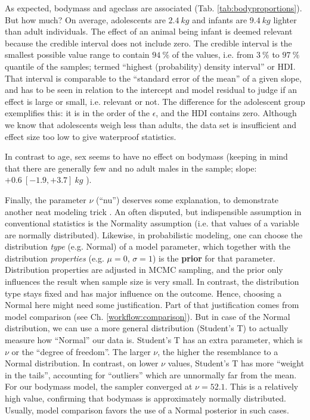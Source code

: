 As expected, bodymass and ageclass are associated (Tab. \ref{tab:bodyproportions}).
But how much?
On average, adolescents are \(2.4\ kg\) and infants are \(9.4\ kg\) lighter than adult individuals.
The effect of an animal being infant is deemed relevant because the credible interval does not include zero.
The credible interval is the smallest possible value range to contain \(94\ \%\) of the values, i.e. from \(3\ \%\) to \(97\ \%\) quantile of the samples; termed ``highest (probability) density interval'' or HDI.
That interval is comparable to the ``standard error of the mean'' of a given slope, and has to be seen in relation to the intercept and model residual to judge if an effect is large or small, i.e. relevant or not.
The difference for the adolescent group exemplifies this: it is in the order of the \(\epsilon\), and the HDI contains zero.
Although we know that adolescents weigh less than adults, the data set is insufficient and effect size too low to give waterproof statistics.

In contrast to age, sex seems to have no effect on bodymass (keeping in mind that there are generally few and no adult males in the sample; slope: \(+0.6\ [-1.9, +3.7]\ kg\) ).

Finally, the parameter \(\nu\) (``nu'') deserves some explanation, to demonstrate another neat modeling trick \citep{Wiecki2013}.
An often disputed, but indispensible assumption in conventional statistics is the Normality assumption (i.e. that values of a variable are normally distributed).
Likewise, in probabilistic modeling, one can choose the distribution \emph{type} (e.g. Normal) of a model parameter, which together with the distribution \emph{properties} (e.g. \(\mu = 0\), \(\sigma = 1\)) is the \textbf{prior} for that parameter.
Distribution properties are adjusted in MCMC sampling, and the prior only influences the result when sample size is very small.
In contrast, the distribution type stays fixed and has major influence on the outcome.
Hence, choosing a Normal here might need some justification.
Part of that justification comes from model comparison (see Ch. \ref{workflow:comparison}).
But in case of the Normal distribution, we can use a more general distribution (Student's T) to actually measure how ``Normal'' our data is.
Student's T has an extra parameter, which is \(\nu\) or the ``degree of freedom''.
The larger \(\nu\), the higher the resemblance to a Normal distribution.
In contrast, on lower \(\nu\) values, Student's T has more ``weight in the tails'', accounting for ``outliers'' which are unnormally far from the mean.
For our bodymass model, the sampler converged at \(\nu = 52.1\).
This is a relatively high value, confirming that bodymass is approximately normally distributed.
Usually, model comparison favors the use of a Normal posterior in such cases.


